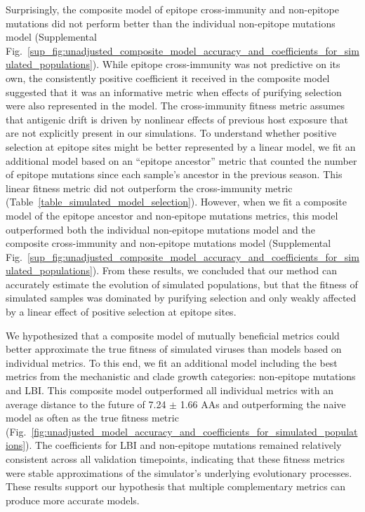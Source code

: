 Surprisingly, the composite model of epitope cross-immunity and non-epitope mutations did not perform better than the individual non-epitope mutations model (Supplemental Fig.~\ref{sup_fig:unadjusted_composite_model_accuracy_and_coefficients_for_simulated_populations}).
While epitope cross-immunity was not predictive on its own, the consistently positive coefficient it received in the composite model suggested that it was an informative metric when effects of purifying selection were also represented in the model.
The cross-immunity fitness metric assumes that antigenic drift is driven by nonlinear effects of previous host exposure \cite{Luksza:2014hj} that are not explicitly present in our simulations.
To understand whether positive selection at epitope sites might be better represented by a linear model, we fit an additional model based on an ``epitope ancestor'' metric that counted the number of epitope mutations since each sample's ancestor in the previous season.
This linear fitness metric did not outperform the cross-immunity metric (Table~\ref{table_simulated_model_selection}).
However, when we fit a composite model of the epitope ancestor and non-epitope mutations metrics, this model outperformed both the individual non-epitope mutations model and the composite cross-immunity and non-epitope mutations model (Supplemental Fig.~\ref{sup_fig:unadjusted_composite_model_accuracy_and_coefficients_for_simulated_populations}).
From these results, we concluded that our method can accurately estimate the evolution of simulated populations, but that the fitness of simulated samples was dominated by purifying selection and only weakly affected by a linear effect of positive selection at epitope sites.

We hypothesized that a composite model of mutually beneficial metrics could better approximate the true fitness of simulated viruses than models based on individual metrics.
To this end, we fit an additional model including the best metrics from the mechanistic and clade growth categories: non-epitope mutations and LBI.
This composite model outperformed all individual metrics with an average distance to the future of 7.24 $\pm$ 1.66 AAs and outperforming the naive model as often as the true fitness metric (Fig.~\ref{fig:unadjusted_model_accuracy_and_coefficients_for_simulated_populations}).
The coefficients for LBI and non-epitope mutations remained relatively consistent across all validation timepoints, indicating that these fitness metrics were stable approximations of the simulator's underlying evolutionary processes.
These results support our hypothesis that multiple complementary metrics can produce more accurate models.

